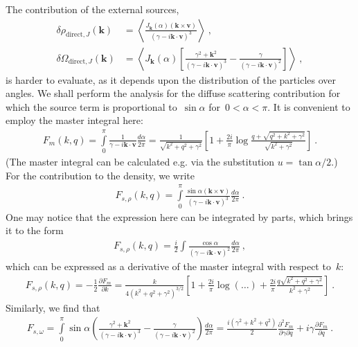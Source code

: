 \documentclass[preprint,aps,eqsecnum]{revtex4-1}
\begin{document}
The contribution of the external sources,
\begin{align}
  \delta \rho_{\mathrm{direct},J}({\bm k}) &=
  \left\langle \frac{J_{\bm k}(\alpha) ({\bm k}\times{\bm v})}{
     (\gamma - i {\bm k}\cdot{\bm v})^3}\right\rangle\ , \\  
  \delta \Omega_{\mathrm{direct},J}({\bm k}) &=
    \left\langle J_{\bm k}(\alpha) \left[
    \frac{\gamma^2 + {\bm k}^2}{(\gamma - i {\bm k}\cdot{\bm v})^3}
   - \frac{\gamma}{\left(\gamma - i {\bm k} \cdot{\bm v}\right)^2}
     \right]                                          
     \right\rangle\ , 
\end{align}
is harder to evaluate, as it depends upon the distribution of
the particles over angles.  We shall perform the analysis
for the diffuse scattering contribution for which
the source term is proportional to~$\sin\alpha$
for~$0 < \alpha < \pi$. It is convenient to employ
the master integral here:
\begin{align}
  F_m(k, q) = \int\limits_{0}^{\pi} \frac{1}{\gamma - i {\bm k} \cdot{\bm v}}
  \frac{d\alpha}{2\pi}
  = \frac{1}{\sqrt{k^2 + q^2 + \gamma^2}}
  \left[1 + \frac{2i}{\pi} \log\frac{q + \sqrt{q^2 + k^2 + \gamma^2}}{
      \sqrt{k^2 + \gamma^2}}\right]\ . 
\end{align}
(The master integral can be calculated e.g. via the substitution
$u = \tan \alpha/2$.)
For the contribution to the density, we write
\begin{align}
  F_{s, \rho}(k, q)
  =  \int\limits_{0}^{\pi} \frac{\sin\alpha ({\bm k}\times{\bm v})}{
  \left(\gamma - i {\bm k} \cdot {\bm v}\right)^3} \frac{d\alpha}{2\pi} \ . 
\end{align}
One may notice that the expression here can be integrated by parts,
which brings it to the form
\begin{align}
  F_{s, \rho}(k, q) = \frac{i}{2} \int\frac{\cos\alpha}{
                    \left(\gamma - i {\bm k} \cdot {\bm v}\right)^2}
  \frac{d\alpha}{2\pi} \ , 
\end{align}
which can be expressed as a derivative of the master integral
with respect to~$k$:
\begin{align}
  F_{s, \rho}(k, q) = -\frac{1}{2} \frac{\partial F_m}{\partial k}
  = \frac{k}{4 (k^2 + q^2 + \gamma^2)^{3/2}}
  \left[1 + \frac{2i}{\pi} \log(\ldots)
   + \frac{2i}{\pi} \frac{q \sqrt{k^2 + q^2 + \gamma^2}}{k^2 + \gamma^2}
  \right]\ . 
\end{align}
Similarly, we find that
\begin{align}
  F_{s, \omega} = \int\limits_{0}^{\pi}
  \sin\alpha \left( \frac{\gamma^2 + {\bm k}^2}{
          \left(\gamma - i {\bm k}\cdot{\bm v}\right)^3}
  - \frac{\gamma}{ \left(\gamma - i {\bm k}\cdot{\bm v}\right)^2}
  \right) \frac{d\alpha}{2\pi}
  = \frac{i(\gamma^2 + k^2 + q^2)}{2}
  \frac{\partial^2 F_m}{\partial\gamma \partial q}
  + i \gamma \frac{\partial F_m}{\partial q}\ . 
\end{align}
\end{document}
